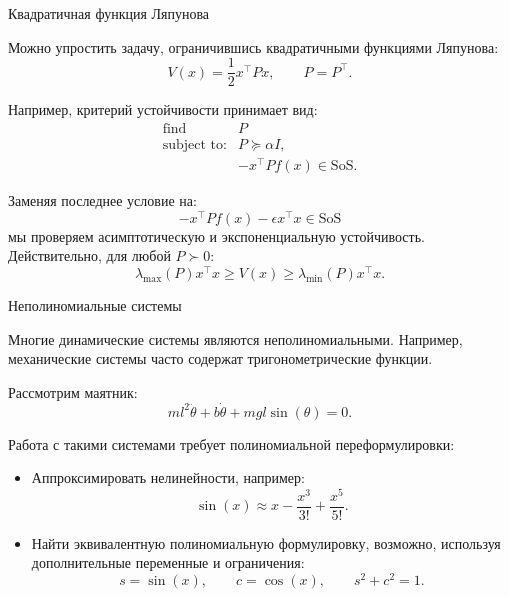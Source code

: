 \documentclass{beamer}
\begin{document}
\begin{frame}{Квадратичная функция Ляпунова}
	\begin{flushleft}
		Можно упростить задачу, ограничившись квадратичными функциями Ляпунова:
		\[
		V(x)=\frac{1}{2}x^\top Px,
		\qquad P=P^\top.
		\]
		
		Например, критерий устойчивости принимает вид:
		\[
		\begin{array}{ll}
			\text{find} & P\\[0.2em]
			\text{subject to:} &
			P\succeq\alpha I,\\
			&
			-x^\top Pf(x)\in\mathrm{SoS}.
		\end{array}
		\]
		
		
		Заменяя последнее условие на:
		\[
		-x^\top Pf(x)-\epsilon x^\top x\in\mathrm{SoS}
		\]
		мы проверяем асимптотическую и экспоненциальную устойчивость. Действительно, для любой $P\succ0$:
		\[
		\lambda_{\max}(P)x^\top x
		\geq V(x)
		\geq
		\lambda_{\min}(P)x^\top x.
		\]
	\end{flushleft}
\end{frame}

\begin{frame}{Неполиномиальные системы}
	\begin{flushleft}
		Многие динамические системы являются неполиномиальными.
		Например, механические системы часто содержат тригонометрические функции.
		
		\bigskip
		
		Рассмотрим маятник:
		\[
		ml^2\ddot{\theta}
		+b\dot{\theta}
		+mgl\sin(\theta)=0.
		\]
		
		\bigskip
		
		Работа с такими системами требует полиномиальной переформулировки:
		
		\begin{itemize}
			\item Аппроксимировать нелинейности, например:
			\[
			\sin(x)\approx
			x-\frac{x^3}{3!}+\frac{x^5}{5!}.
			\]
			
			\item Найти эквивалентную полиномиальную формулировку,
			возможно, используя дополнительные переменные и ограничения:
			\[
			s=\sin(x),\qquad
			c=\cos(x),\qquad
			s^2+c^2=1.
			\]
		\end{itemize}
	\end{flushleft}
	
\end{frame}
\end{document}
